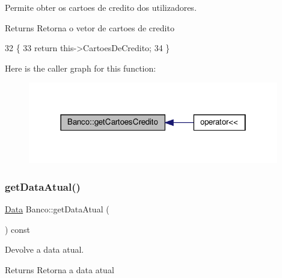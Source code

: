 Permite obter os cartoes de credito dos utilizadores. 

\begin{DoxyReturn}{Returns}
Retorna o vetor de cartoes de credito 
\end{DoxyReturn}

\begin{DoxyCode}
32 \{
33     \textcolor{keywordflow}{return} this->CartoesDeCredito;
34 \}
\end{DoxyCode}
Here is the caller graph for this function\+:
\nopagebreak
\begin{figure}[H]
\begin{center}
\leavevmode
\includegraphics[width=310pt]{classBanco_a859463228f6bf63d32d70afe8efd9541_icgraph}
\end{center}
\end{figure}
\mbox{\label{classBanco_a0735f07636c578666068a16f6ecccd91}} 
\subsubsection{\texorpdfstring{get\+Data\+Atual()}{getDataAtual()}}
{\footnotesize\ttfamily \hyperlink{classData}{Data} Banco\+::get\+Data\+Atual (\begin{DoxyParamCaption}{ }\end{DoxyParamCaption}) const}



Devolve a data atual. 

\begin{DoxyReturn}{Returns}
Retorna a data atual 
\end{DoxyReturn}

